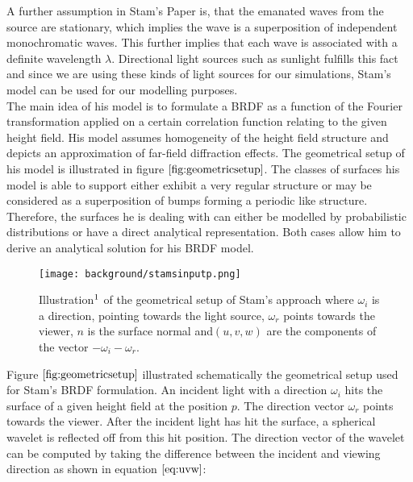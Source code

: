 A further assumption in Stam's Paper is, that the emanated waves from the source are stationary, which implies the wave is a superposition of independent monochromatic waves. This further implies that each wave is associated with a definite wavelength $\lambda$. Directional light sources such as sunlight fulfills this fact and since we are using these kinds of light sources for our simulations, Stam's model can be used for our modelling purposes. \\

The main idea of his model is to formulate a BRDF as a function of the Fourier transformation applied on a certain correlation function relating to the given height field. His model assumes homogeneity of the height field structure and depicts an approximation of far-field diffraction effects. The geometrical setup of his model is illustrated in figure $\ref{fig:geometricsetup}$. The classes of surfaces his model is able to support either exhibit a very regular structure or may be considered as a superposition of bumps forming a periodic like structure. Therefore, the surfaces he is dealing with can either be modelled by probabilistic distributions or have a direct analytical representation. Both cases allow him to derive an analytical solution for his BRDF model.

\begin{figure}[H]
  \centering
  \texttt{[image: background/stamsinputp.png]}
  \caption[Stam's geometrical setup]{Illustration$\footnotemark$ of the geometrical setup of Stam's approach where $\omega_i$ is a direction, pointing towards the light source, $\omega_r$ points towards the viewer, $n$ is the surface normal and$ (u,v,w)$ are the components of the vector $-\omega_i - \omega_r$.}
  \label{fig:geometricsetup}  
\end{figure}

Figure $\ref{fig:geometricsetup}$ illustrated schematically the geometrical setup used for Stam's BRDF formulation. An incident light with a direction $\omega_i$ hits the surface of a given height field at the position $p$. The direction vector $\omega_r$ points towards the viewer. After the incident light has hit the surface, a spherical wavelet is reflected off from this hit position. The direction vector of the wavelet can be computed by taking the difference between the incident and viewing direction as shown in equation $\ref{eq:uvw}$:

